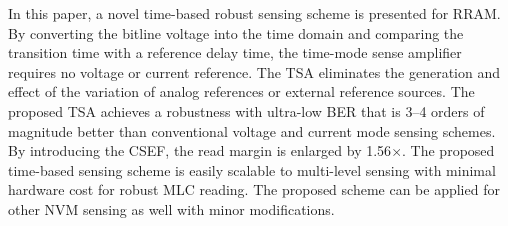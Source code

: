 In this paper, a novel time-based robust sensing scheme is presented for RRAM. By converting the bitline voltage into the time domain and comparing the transition time with a reference delay time, the time-mode sense amplifier requires no voltage or current reference. The TSA eliminates the generation and effect of the variation of analog references or external reference sources. 
The proposed TSA achieves a robustness with ultra-low BER that is 3--4 orders of magnitude better than conventional voltage and current mode sensing schemes.
By introducing the CSEF, the read margin is enlarged by 1.56$\times$.
The proposed time-based sensing scheme is easily scalable to multi-level sensing with minimal hardware cost for robust MLC reading.
The proposed scheme can be applied for other NVM sensing as well with minor modifications.